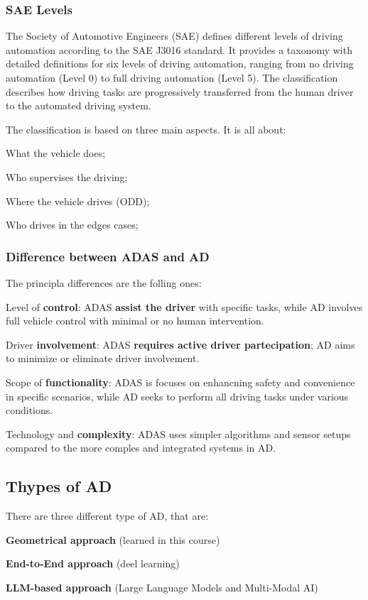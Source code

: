 \subsubsection{SAE Levels}

The Society of Automotive Engineers (SAE) defines different levels of driving automation according to the SAE J3016 standard. It provides a taxonomy with detailed definitions for six levels of driving automation, ranging from no driving automation (Level 0) to full driving automation (Level 5). The classification describes how driving tasks are progressively transferred from the human driver to the automated driving system.

The classification is based on three main aspects. It is all about:
\begin{compactitemize}
\item What the vehicle does;
\item Who supervises the driving;
\item Where the vehicle drives (ODD);
\item Who drives in the edges cases;
\end{compactitemize}

\subsubsection{Difference between ADAS and AD}
The principla differences are the folling ones:
\begin{compactitemize}
    \item Level of \textbf{control}: ADAS \textbf{assist the driver} with specific tasks, while AD involves full vehicle control with minimal or no human intervention.
    \item Driver \textbf{involvement}: ADAS \textbf{requires active driver partecipation}; AD aims to minimize or eliminate driver involvement.
    \item Scope of \textbf{functionality}: ADAS is focuses on enhancning safety and convenience in specific scenarios, while AD seeks to perform all driving tasks under various conditions.
    \item Technology and \textbf{complexity}: ADAS uses simpler algorithms and sensor setups compared to the more comples and integrated systems in AD.
\end{compactitemize}

\subsection{Thypes of AD}
There are three different type of AD, that are:
\begin{compactitemize}
    \item \textbf{Geometrical approach} (learned in this course)
    \item \textbf{End-to-End approach} (deel learning)
    \item \textbf{LLM-based approach} (Large Language Models and Multi-Modal AI)
\end{compactitemize}

